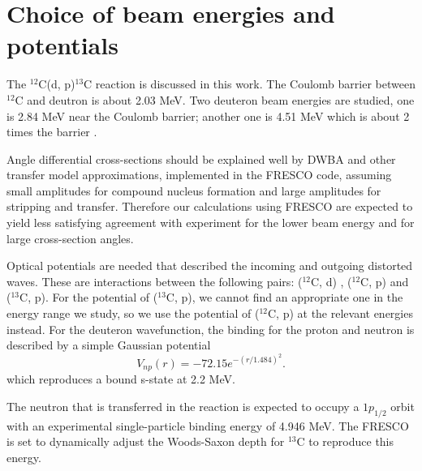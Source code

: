 \section{Choice of beam energies and potentials} \label{part1}
	The $^{12}$C(d, p)$^{13}$C reaction is discussed in this work. 
	The Coulomb barrier between $^{12}$C and deutron is about 2.03 MeV.
	Two deuteron beam energies are studied, one is 2.84 MeV near the Coulomb barrier; another one is 4.51 MeV which is about 2 times the barrier .
	
	Angle differential cross-sections should be explained well by DWBA and other transfer model approximations, implemented in the FRESCO code, assuming small amplitudes for compound nucleus formation and large amplitudes for stripping and transfer. 
	Therefore our calculations using FRESCO are expected to yield less satisfying agreement with experiment for the lower beam energy and for large cross-section angles.
	
	Optical potentials are needed that described the incoming and outgoing distorted waves.  
	These are interactions between the following pairs: ($^{12}$C, d) \cite{PhysRevC.73.054605}, ($^{12}$C, p) \cite{PTCOG} and ($^{13}$C, p). 
	For the potential of ($^{13}$C, p), we cannot find an appropriate one in the energy range we study, 
	so we use the potential of ($^{12}$C, p) at the relevant energies instead. 
	For the deuteron wavefunction, the binding for the proton and neutron is described by a simple Gaussian potential 
	\begin{equation}
		V_{np}(r)=-72.15e^{-(r/1.484)^2}.
	\end{equation}
	which reproduces a bound s-state at 2.2 MeV.
	
	The neutron that is transferred in the reaction is expected to occupy a $1p_{1/2}$ orbit with an experimental single-particle binding energy of 4.946 MeV. 
	The FRESCO is set to dynamically adjust the Woods-Saxon depth for $^{13}$C to reproduce this energy.
	
	
